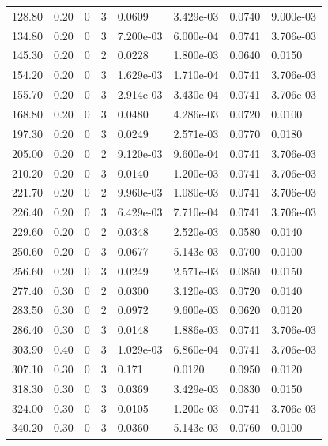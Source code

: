 \documentclass[preview]{standalone}
\begin{document}
{{\begin{tabular}{L{1.2cm}C{1.2cm} C{0.3cm}C{0.5cm} C{1.4cm}C{1.4cm} C{1.4cm}C{1.4cm}}
  128.80  &  0.20  & 0     &  3 &  0.0609  & 3.429e-03  & 0.0740 &  9.000e-03   \\ 
  134.80  &  0.20  & 0     &  3 &  7.200e-03  & 6.000e-04  & 0.0741 &  3.706e-03   \\ 
  145.30  &  0.20  & 0     &  2 &  0.0228  & 1.800e-03  & 0.0640 &  0.0150   \\ 
  154.20  &  0.20  & 0     &  3 &  1.629e-03  & 1.710e-04  & 0.0741 &  3.706e-03   \\ 
  155.70  &  0.20  & 0     &  3 &  2.914e-03  & 3.430e-04  & 0.0741 &  3.706e-03   \\ 
  168.80  &  0.20  & 0     &  3 &  0.0480  & 4.286e-03  & 0.0720 &  0.0100   \\ 
  197.30  &  0.20  & 0     &  3 &  0.0249  & 2.571e-03  & 0.0770 &  0.0180   \\ 
  205.00  &  0.20  & 0     &  2 &  9.120e-03  & 9.600e-04  & 0.0741 &  3.706e-03   \\ 
  210.20  &  0.20  & 0     &  3 &  0.0140  & 1.200e-03  & 0.0741 &  3.706e-03   \\ 
  221.70  &  0.20  & 0     &  2 &  9.960e-03  & 1.080e-03  & 0.0741 &  3.706e-03   \\ 
  226.40  &  0.20  & 0     &  3 &  6.429e-03  & 7.710e-04  & 0.0741 &  3.706e-03   \\ 
  229.60  &  0.20  & 0     &  2 &  0.0348  & 2.520e-03  & 0.0580 &  0.0140   \\ 
  250.60  &  0.20  & 0     &  3 &  0.0677  & 5.143e-03  & 0.0700 &  0.0100   \\ 
  256.60  &  0.20  & 0     &  3 &  0.0249  & 2.571e-03  & 0.0850 &  0.0150   \\ 
  277.40  &  0.30  & 0     &  2 &  0.0300  & 3.120e-03  & 0.0720 &  0.0140   \\ 
  283.50  &  0.30  & 0     &  2 &  0.0972  & 9.600e-03  & 0.0620 &  0.0120   \\ 
  286.40  &  0.30  & 0     &  3 &  0.0148  & 1.886e-03  & 0.0741 &  3.706e-03   \\ 
  303.90  &  0.40  & 0     &  3 &  1.029e-03  & 6.860e-04  & 0.0741 &  3.706e-03   \\ 
  307.10  &  0.30  & 0     &  3 &  0.171  & 0.0120  & 0.0950 &  0.0120   \\ 
  318.30  &  0.30  & 0     &  3 &  0.0369  & 3.429e-03  & 0.0830 &  0.0150   \\ 
  324.00  &  0.30  & 0     &  3 &  0.0105  & 1.200e-03  & 0.0741 &  3.706e-03   \\ 
  340.20  &  0.30  & 0     &  3 &  0.0360  & 5.143e-03  & 0.0760 &  0.0100   \\ 

\end{tabular}}}
\end{document}
